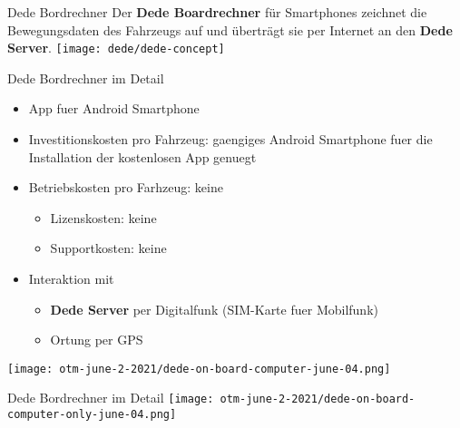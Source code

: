 
\begin{frame}{Dede Bordrechner}
  Der \textbf{Dede Boardrechner} für Smartphones zeichnet die Bewegungsdaten des Fahrzeugs auf und überträgt sie per Internet an den \textbf{Dede Server}.
  \texttt{[image: dede/dede-concept]}
\end{frame}

\begin{frame}{Dede Bordrechner im Detail}
  \begin{itemize}
  \item App fuer Android Smartphone
  \item Investitionskosten pro Fahrzeug: gaengiges Android Smartphone fuer die Installation der kostenlosen App genuegt
  \item Betriebskosten pro Farhzeug: keine
    \begin{itemize}
    \item Lizenskosten: keine
    \item Supportkosten: keine
    \end{itemize}
  \item Interaktion mit
    \begin{itemize}
    \item \textbf{Dede Server} per Digitalfunk (SIM-Karte fuer Mobilfunk)
    \item Ortung per GPS
    \end{itemize}
  \end{itemize}
  \texttt{[image: otm-june-2-2021/dede-on-board-computer-june-04.png]}
\end{frame}

\begin{frame}{Dede Bordrechner im Detail}
  \center\texttt{[image: otm-june-2-2021/dede-on-board-computer-only-june-04.png]}
\end{frame}
